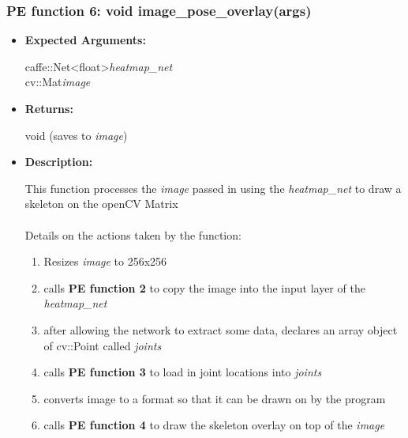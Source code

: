 \documentclass{scrreprt}
\begin{document}
\subsubsection{PE function 6: void image\_pose\_overlay(args)}
\begin{itemize}
    \item \textbf{Expected Arguments:}

    caffe::Net\textless float\textgreater\quad\textit{heatmap\_net}
    \\
    cv::Mat\quad\textit{image}

    \item \textbf{Returns:}

    void (saves to \textit{image})

    \item \textbf{Description:}

    This function processes the \textit{image} passed in using the \textit{heatmap\_net} to draw a skeleton on the openCV Matrix
    \\\\
    Details on the actions taken by the function:
    \begin{enumerate}
        \item Resizes \textit{image} to 256x256

        \item calls \textbf{PE function 2} to copy the image into the input layer of the \textit{heatmap\_net}

        \item after allowing the network to extract some data, declares an array object of cv::Point called \textit{joints}

        \item calls \textbf{PE function 3} to load in joint locations into \textit{joints}

        \item converts image to a format so that it can be drawn on by the program

        \item calls \textbf{PE function 4} to draw the skeleton overlay on top of the \textit{image}
    \end{enumerate}
\end{itemize}
\end{document}
